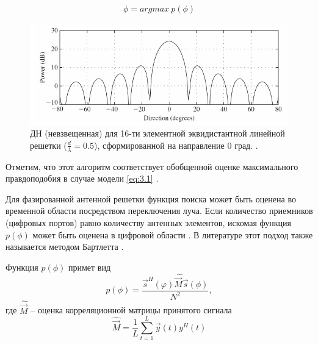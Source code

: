 \begin{equation}
    \phi = argmax~p(\phi)
\end{equation}

\begin{figure}
    \centering
    \includegraphics[width=\linewidth]{figs/fig3.9}
    \caption{ДН (невзвещенная) для 16-ти элементной эквидистантной линейной
        решетки ($\frac{d}{\lambda}=0.5$), сформированной на направление 0
        град. \cite{Tuncer2009}. }
    \label{fig:3.9}
\end{figure}

Отметим, что этот алгоритм соответствует обобщенной оценке максимального
правдоподобия в случае модели \eqref{eq:3.1} \cite{Tuncer2009}.

Для фазированной антенной решетки
функция поиска может быть оценена во временной области посредством переключения
луча. Если количество приемников (цифровых портов) равно количеству антенных
элементов, искомая функция $p(\phi)$ может быть оценена в цифровой области \cite{Stoica2005}.
В литературе этот подход также называется методом Бартлетта \cite{Godara2004}. 

Функция $p(\phi)$ примет вид
\begin{equation}
    p(\phi) = \frac{\vec s^H(\varphi) \hat{\vec M} \vec s (\phi)}{N^2},
\end{equation}
где $\hat \vec M$ -- оценка корреляционной матрицы принятого сигнала
\begin{equation}
    \hat {\vec M} = \frac{1}{L} \sum\limits_{t=1}^{L} \vec y(t) y^H (t)
\end{equation}

